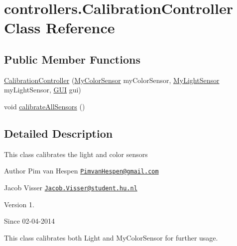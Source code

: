 \hypertarget{classcontrollers_1_1_calibration_controller}{\section{controllers.\-Calibration\-Controller Class Reference}
\label{classcontrollers_1_1_calibration_controller}
}
\subsection*{Public Member Functions}
\begin{DoxyCompactItemize}
\item 
\hyperlink{classcontrollers_1_1_calibration_controller_a4b485270ecb0e5ee1f30940bc8b4c201}{Calibration\-Controller} (\hyperlink{classsensors_1_1_my_color_sensor}{My\-Color\-Sensor} my\-Color\-Sensor, \hyperlink{classsensors_1_1_my_light_sensor}{My\-Light\-Sensor} my\-Light\-Sensor, \hyperlink{classgui_1_1_g_u_i}{G\-U\-I} gui)
\item 
void \hyperlink{classcontrollers_1_1_calibration_controller_a701e8d1d358d63ae1c318932e870dc03}{calibrate\-All\-Sensors} ()
\end{DoxyCompactItemize}


\subsection{Detailed Description}
This class calibrates the light and color sensors

\begin{DoxyAuthor}{Author}
Pim van Hespen \href{mailto:PimvanHespen@gmail.com}{\tt Pimvan\-Hespen@gmail.\-com} 

Jacob Visser \href{mailto:Jacob.Visser@student.hu.nl}{\tt Jacob.\-Visser@student.\-hu.\-nl} 
\end{DoxyAuthor}
\begin{DoxyVersion}{Version}
1. 
\end{DoxyVersion}
\begin{DoxySince}{Since}
02-\/04-\/2014 \begin{DoxyVerb}   This class calibrates both Light and MyColorSensor for further usage.\end{DoxyVerb}
 
\end{DoxySince}


